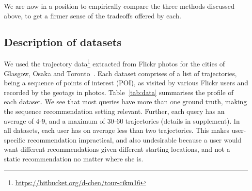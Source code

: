 
We are now in a position to empirically compare the three methods discussed above,
to get a firmer sense of the tradeoffs offered by each.

%
\subsection{Description of datasets}

We used the trajectory data\footnote{\url{https://bitbucket.org/d-chen/tour-cikm16}}
extracted from Flickr photos for the cities of Glasgow, Osaka and
Toronto~\cite{ijcai15,cikm16paper}.
Each dataset comprises of a
list of trajectories, being a sequence of points of interest (POI),
as visited by various Flickr users and recorded by the geotags in photos.
Table~\ref{tab:data} summarises the profile of each dataset.
We see that most queries have more than one ground truth, making the sequence recommendation setting relevant. Further, each query has an average of 4-9, and a maximum of 30-60 trajectories (details in supplement).
In all datasets,
each user has on average less than two trajectories.
This makes user-specific recommendation impractical, and also undesirable because
a user would want different recommendations given different starting locations, and not a static recommendation no matter where she is.

\begin{table}[t]
	\begin{minipage}[t]{\linewidth}
		\label{tab:data}
	\end{minipage}
\end{table}


